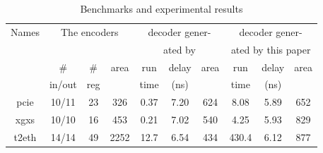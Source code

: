 \documentclass[conference]{IEEEtran}
\begin{document}
\begin{table}[b]
\caption{Benchmarks and experimental results}
\centering
\begin{tabular}{|c|c|c|c|c|c|c|c|c|c|}
\hline
 Names     & \multicolumn{3}{|c|}{The encoders}                                  &   \multicolumn{3}{|c|}{decoder gener-}             &   \multicolumn{3}{|c|}{decoder gener-} \\    
           & \multicolumn{3}{|c|}{}                                              &   \multicolumn{3}{|c|}{ated by \cite{ShenTCAD11}}  &   \multicolumn{3}{|c|}{ated by this paper} \\\cline{2-10}
           &    \#   &   \#    &area                                             &run  &delay&area                                     &run  &delay&area \\
           & in/out  &  reg    &                                                 &time &(ns) &                                        &time &(ns) &    \\\hline\hline
 pcie      & 10/11   & 23      & 326                                             &0.37 &7.20 &624                                     &8.08 & 5.89&652 \\\hline
 xgxs      & 10/10   & 16      & 453                                             &0.21 &7.02 &540                                     &4.25 & 5.93&829 \\\hline
 t2eth     & 14/14   & 49      & 2252                                            &12.7 &6.54 &434                                     &430.4& 6.12&877 \\\hline
\end{tabular}\label{tab_bench}
\end{table}


%            
%            
\end{document}
